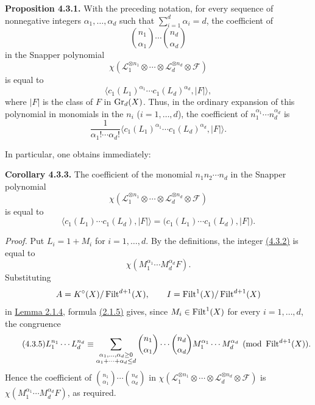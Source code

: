 \textbf{Proposition 4.3.1.}
With the preceding notation, for every sequence of nonnegative integers
$\alpha_1,\ldots,\alpha_d$ such that
$\sum_{i=1}^d\alpha_i=d$, the coefficient of
\[
\binom{n_1}{\alpha_1}\cdots\binom{n_d}{\alpha_d}
\]
in the Snapper polynomial
\[
\chi(\mathcal L_1^{\otimes n_1}\otimes\cdots\otimes
\mathcal L_d^{\otimes n_d}\otimes\mathcal F)
\]
is equal to
\begin{equation}\tag{4.3.2}
\bigl\langle c_1(L_1)^{\alpha_1}\cdots
c_1(L_d)^{\alpha_d},\lvert F\rvert\bigr\rangle,
\end{equation}
where $\lvert F\rvert$ is the class of $F$ in $\operatorname{Gr}_d(X)$. Thus, in the ordinary
expansion of this polynomial in monomials in the $n_i$ ($i=1,\ldots,d$),
the coefficient of $n_1^{\alpha_1}\cdots n_d^{\alpha_d}$ is
\[
\frac{1}{\alpha_1!\cdots\alpha_d!}
\bigl\langle c_1(L_1)^{\alpha_1}\cdots
c_1(L_d)^{\alpha_d},\lvert F\rvert\bigr\rangle.
\]

In particular, one obtains immediately:

\textbf{Corollary 4.3.3.}
The coefficient of the monomial $n_1n_2\cdots n_d$ in the Snapper polynomial
\[
\chi(\mathcal L_1^{\otimes n_1}\otimes\cdots\otimes
\mathcal L_d^{\otimes n_d}\otimes\mathcal F)
\]
is equal to
\begin{equation}\tag{4.3.4}
\bigl\langle c_1(L_1)\cdots c_1(L_d),\lvert F\rvert\bigr\rangle
=\bigl(c_1(L_1)\cdots c_1(L_d),\lvert F\rvert\bigr).
\end{equation}

\emph{Proof.}
Put $L_i=1+M_i$ for $i=1,\ldots,d$. By the definitions, the integer \hyperlink{sga6.e10.eq.4-3-2}{(4.3.2)}
is equal to
\[
\chi(M_1^{\alpha_1}\cdots M_d^{\alpha_d}F).
\]
Substituting
\[
A=K^\circ(X)/\operatorname{Filt}^{d+1}(X),
\qquad I=\operatorname{Filt}^1(X)/\operatorname{Filt}^{d+1}(X)
\]
in \hyperlink{sga6.e10.lem.2-1-4}{Lemma 2.1.4}, formula \hyperlink{sga6.e10.eq.2-1-5}{(2.1.5)} gives, since
$M_i\in\operatorname{Filt}^1(X)$ for every $i=1,\ldots,d$, the congruence
\begin{equation}\tag{4.3.5}
L_1^{n_1}\cdots L_d^{n_d}\equiv
\sum_{\substack{\alpha_1,\ldots,\alpha_d\geq0\\
\alpha_1+\cdots+\alpha_d\leq d}}
\binom{n_1}{\alpha_1}\cdots\binom{n_d}{\alpha_d}
M_1^{\alpha_1}\cdots M_d^{\alpha_d}
\pmod{\operatorname{Filt}^{d+1}(X)}.
\end{equation}
Hence the coefficient of
$\binom{n_1}{\alpha_1}\cdots\binom{n_d}{\alpha_d}$ in
$\chi(\mathcal L_1^{\otimes n_1}\otimes\cdots\otimes
\mathcal L_d^{\otimes n_d}\otimes\mathcal F)$ is
$\chi(M_1^{\alpha_1}\cdots M_d^{\alpha_d}F)$, as required.

